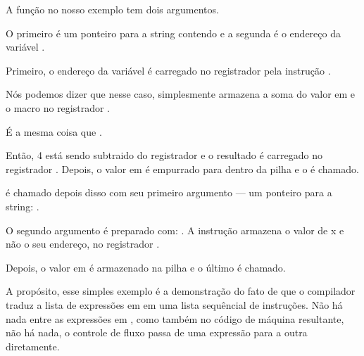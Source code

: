 A função \scanf no nosso exemplo tem dois argumentos.

O primeiro é um ponteiro para a string contendo  e a segunda é o endereço da variável .

Primeiro, o endereço da variável  é carregado no registrador \EAX pela instrução .

\PTBRph{}

Nós podemos dizer que nesse caso, \LEA simplesmente armazena a soma do valor em \EBP e o macro  no registrador \EAX.

É a mesma coisa que .

Então, 4 está sendo subtraido do registrador \EBP e o resultado é carregado no registrador \EAX.
Depois, o valor em \EAX é empurrado para dentro da pilha e o \scanf é chamado.

\printf é chamado depois disso com seu primeiro argumento --- um ponteiro para a string:
.

O segundo argumento é preparado com: .
A instrução armazena o valor de x e não o seu endereço, no registrador \ECX.

Depois, o valor em \ECX é armazenado na pilha e o último \printf é chamado.


\myparagraph{\PTBRph{}}

A propósito, esse simples exemplo é a demonstração do fato de que o compilador traduz a lista de expressões em \CCpp em uma lista sequêncial de instruções.
Não há nada entre as expressões em \CCpp, como também no código de máquina resultante, não há nada, o controle de fluxo passa de uma expressão para a outra diretamente.

